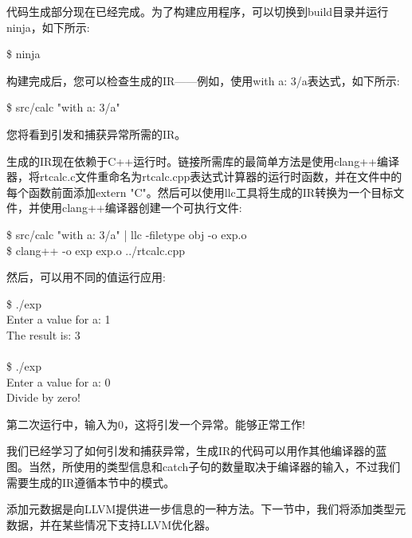 代码生成部分现在已经完成。为了构建应用程序，可以切换到build目录并运行ninja，如下所示:\par

\begin{tcolorbox}[colback=white,colframe=black]
\$ ninja
\end{tcolorbox}

构建完成后，您可以检查生成的IR——例如，使用with a: 3/a表达式，如下所示:\par

\begin{tcolorbox}[colback=white,colframe=black]
\$ src/calc "with a: 3/a"
\end{tcolorbox}

您将看到引发和捕获异常所需的IR。\par

生成的IR现在依赖于C++运行时。链接所需库的最简单方法是使用clang++编译器，将rtcalc.c文件重命名为rtcalc.cpp表达式计算器的运行时函数，并在文件中的每个函数前面添加extern "C"。然后可以使用llc工具将生成的IR转换为一个目标文件，并使用clang++编译器创建一个可执行文件:\par

\begin{tcolorbox}[colback=white,colframe=black]
\$ src/calc "with a: 3/a" | llc -filetype obj -o exp.o \\
\$ clang++ -o exp exp.o ../rtcalc.cpp
\end{tcolorbox}

然后，可以用不同的值运行应用:\par

\begin{tcolorbox}[colback=white,colframe=black]
\$ ./exp \\
Enter a value for a: 1 \\
The result is: 3\\
\\
\$ ./exp \\
Enter a value for a: 0 \\
Divide by zero!
\end{tcolorbox}

第二次运行中，输入为0，这将引发一个异常。能够正常工作!\par

我们已经学习了如何引发和捕获异常，生成IR的代码可以用作其他编译器的蓝图。当然，所使用的类型信息和catch子句的数量取决于编译器的输入，不过我们需要生成的IR遵循本节中的模式。\par

添加元数据是向LLVM提供进一步信息的一种方法。下一节中，我们将添加类型元数据，并在某些情况下支持LLVM优化器。\par










